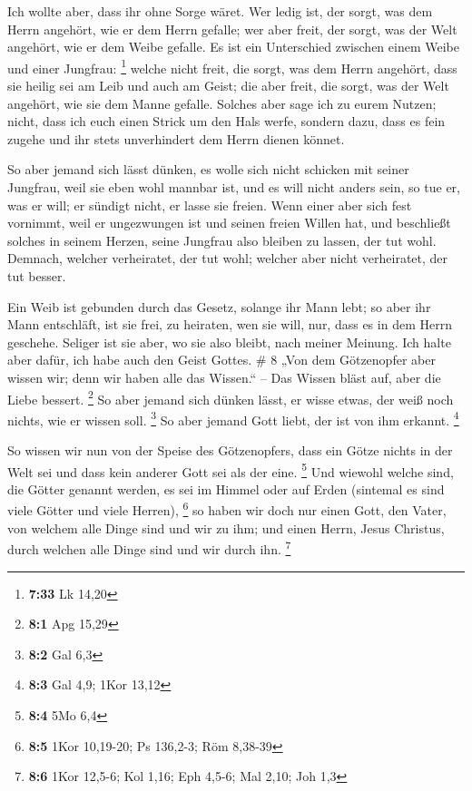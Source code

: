  Ich wollte aber, dass ihr ohne Sorge wäret. Wer ledig ist,
der sorgt, was dem Herrn angehört, wie er dem Herrn gefalle;
 wer aber freit, der sorgt, was der Welt angehört, wie er
dem Weibe gefalle. Es ist ein Unterschied zwischen einem Weibe und einer
Jungfrau: \footnote{\textbf{7:33} Lk 14,20}  welche nicht
freit, die sorgt, was dem Herrn angehört, dass sie heilig sei am Leib
und auch am Geist; die aber freit, die sorgt, was der Welt angehört, wie
sie dem Manne gefalle.  Solches aber sage ich zu eurem
Nutzen; nicht, dass ich euch einen Strick um den Hals werfe, sondern
dazu, dass es fein zugehe und ihr stets unverhindert dem Herrn dienen
könnet.

 So aber jemand sich lässt dünken, es wolle sich nicht
schicken mit seiner Jungfrau, weil sie eben wohl mannbar ist, und es
will nicht anders sein, so tue er, was er will; er sündigt nicht, er
lasse sie freien.  Wenn einer aber sich fest vornimmt, weil
er ungezwungen ist und seinen freien Willen hat, und beschließt solches
in seinem Herzen, seine Jungfrau also bleiben zu lassen, der tut wohl.
 Demnach, welcher verheiratet, der tut wohl; welcher aber
nicht verheiratet, der tut besser.

 Ein Weib ist gebunden durch das Gesetz, solange ihr Mann
lebt; so aber ihr Mann entschläft, ist sie frei, zu heiraten, wen sie
will, nur, dass es in dem Herrn geschehe.  Seliger ist sie
aber, wo sie also bleibt, nach meiner Meinung. Ich halte aber dafür, ich
habe auch den Geist Gottes. \# 8  „Von dem Götzenopfer aber
wissen wir; denn wir haben alle das Wissen.`` -- Das Wissen bläst auf,
aber die Liebe bessert. \footnote{\textbf{8:1} Apg 15,29} 
So aber jemand sich dünken lässt, er wisse etwas, der weiß noch nichts,
wie er wissen soll. \footnote{\textbf{8:2} Gal 6,3}  So aber
jemand Gott liebt, der ist von ihm erkannt. \footnote{\textbf{8:3} Gal
  4,9; 1Kor 13,12}

 So wissen wir nun von der Speise des Götzenopfers, dass ein
Götze nichts in der Welt sei und dass kein anderer Gott sei als der
eine. \footnote{\textbf{8:4} 5Mo 6,4}  Und wiewohl welche
sind, die Götter genannt werden, es sei im Himmel oder auf Erden
(sintemal es sind viele Götter und viele Herren), \footnote{\textbf{8:5}
  1Kor 10,19-20; Ps 136,2-3; Röm 8,38-39}  so haben wir doch
nur einen Gott, den Vater, von welchem alle Dinge sind und wir zu ihm;
und einen Herrn, Jesus Christus, durch welchen alle Dinge sind und wir
durch ihn. \footnote{\textbf{8:6} 1Kor 12,5-6; Kol 1,16; Eph 4,5-6; Mal
  2,10; Joh 1,3}

